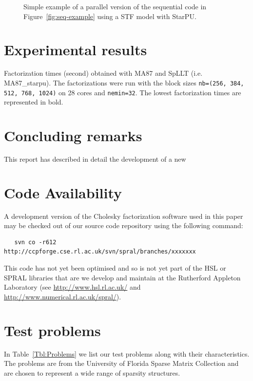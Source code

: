 \documentclass{article}
\newcommand{\starpu}{{StarPU}\xspace}
\begin{document}
\begin{figure}[!h]
  \centering 
  \caption{\label{fig:stf-example}Simple example of a parallel version
    of the sequential code in Figure~\ref{fig:seq-example} using a STF
    model with \starpu.}
\end{figure}

\section{Experimental results}\label{sec:experiments}

\begin{table}[htbp]
    \begin{center}
      
    \end{center}
    \caption{Factorization times (second) obtained with MA87 and SpLLT
      (i.e. MA87\_starpu). The factorizations were run with the block
      sizes \texttt{nb=(256, 384, 512, 768, 1024)} on 28 cores and
      \texttt{nemin=32}. The lowest factorization times are
      represented in bold.}
\end{table}

\section{Concluding remarks}\label{sec:conclusions}
This report has described in detail the development of a new

 
\section*{Code Availability}
A development version of the Cholesky factorization software used in this 
paper may be checked out of
our source code repository using the following command:

\begin{verbatim}
   svn co -r612 http://ccpforge.cse.rl.ac.uk/svn/spral/branches/xxxxxxx
\end{verbatim}

This code has not yet been optimised and so is not yet
part of the HSL or SPRAL libraries that are we develop
and maintain at the Rutherford Appleton Laboratory (see
\url{http://www.hsl.rl.ac.uk/} and \url{http://www.numerical.rl.ac.uk/spral/}).

\clearpage


\appendix

\section{Test problems}\label{appendix}
\setcounter{equation}{0}
\setcounter{table}{0}
\setcounter{figure}{0}
\setcounter{table}{0}
\renewcommand{\thetable}{A.\arabic{table}}


In Table~\ref{Tbl:Problems} we list  our test problems along with 
their characteristics. The problems are from the 
University of Florida Sparse Matrix Collection  and are chosen 
to represent a wide range of sparsity structures.
\end{document}
